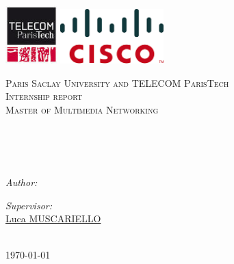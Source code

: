 \documentclass[11pt, oneside]{Thesis} %
\begin{document}
\begin{titlepage}

\begin{center}
 \includegraphics[width=0.15\textwidth,natwidth=610,natheight=642]{telecom.jpeg}
 \includegraphics[width=0.3\textwidth,natwidth=610,natheight=642]{cisco.png}

\textsc{\LARGE Paris Saclay University and TELECOM ParisTech}\\[1.5cm] %
\textsc{\Large Internship report \\ Master of Multimedia Networking} %

\HRule \\[0.2cm] %
{\huge \bfseries \ttitle}\\[0.4cm] %
\HRule \\[1.2cm] %


\begin{minipage}{0.4\textwidth}

\begin{flushleft} \large
\emph{Author:}\\
{\authornames} %
\end{flushleft}
\end{minipage}
\begin{minipage}{0.4\textwidth}

\begin{flushright} \large
\emph{Supervisor:}\\
\href{https://scholar.google.com/citations?user=Q36qUAsAAAAJ&hl=fr}{Luca MUSCARIELLO}\\
\end{flushright}

\end{minipage}\\[1.8cm]






{\large \today}
\vfill
\end{center}

\end{titlepage}
\end{document}
